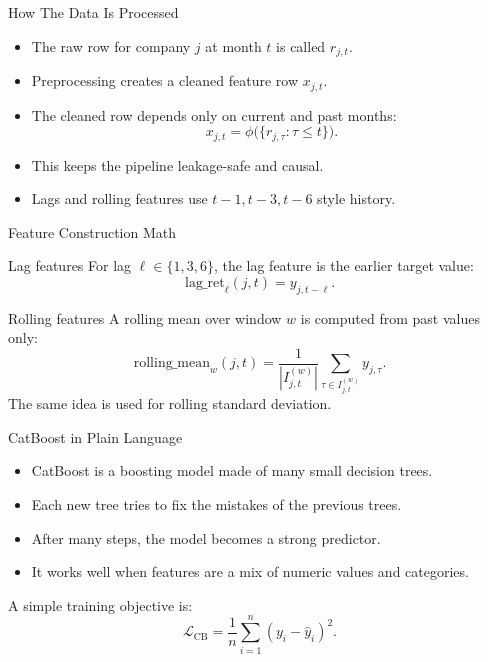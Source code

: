 \documentclass[aspectratio=169]{beamer}
\newcommand{\haty}{\hat{y}}
\newcommand{\loss}{\mathcal{L}}
\begin{document}
\begin{frame}{How The Data Is Processed}
  \begin{itemize}
    \item The raw row for company $j$ at month $t$ is called $r_{j,t}$.
    \item Preprocessing creates a cleaned feature row $x_{j,t}$.
    \item The cleaned row depends only on current and past months:
    \[
      x_{j,t} = \phi\big(\{r_{j,\tau} : \tau \le t\}\big).
    \]
    \item This keeps the pipeline leakage-safe and causal.
    \item Lags and rolling features use $t-1,t-3,t-6$ style history.
  \end{itemize}
\end{frame}

\begin{frame}{Feature Construction Math}
  \begin{block}{Lag features}
    For lag $\ell \in \{1,3,6\}$, the lag feature is the earlier target value:
    \[
      \mathrm{lag\_ret}_\ell(j,t) = y_{j,t-\ell}.
    \]
  \end{block}

  \begin{block}{Rolling features}
    A rolling mean over window $w$ is computed from past values only:
    \[
      \mathrm{rolling\_mean}_w(j,t) = \frac{1}{|I_{j,t}^{(w)}|}\sum_{\tau \in I_{j,t}^{(w)}} y_{j,\tau}.
    \]
    The same idea is used for rolling standard deviation.
  \end{block}
\end{frame}

\begin{frame}{CatBoost in Plain Language}
  \begin{itemize}
    \item CatBoost is a boosting model made of many small decision trees.
    \item Each new tree tries to fix the mistakes of the previous trees.
    \item After many steps, the model becomes a strong predictor.
    \item It works well when features are a mix of numeric values and categories.
  \end{itemize}

  A simple training objective is:
  \[
    \loss_{\mathrm{CB}} = \frac{1}{n} \sum_{i=1}^{n} (y_i - \haty_i)^2.
  \]
\end{frame}
\end{document}
